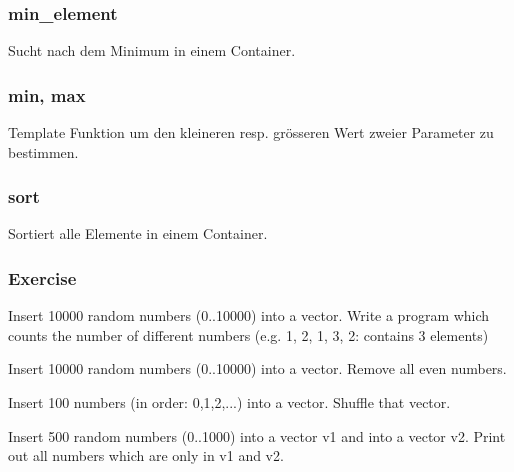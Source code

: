\begin{frame}[fragile]
\frametitle{min\_element}
{\tiny
Sucht nach dem Minimum in einem Container.


}
\end{frame}

\begin{frame}[fragile]
\frametitle{min, max}
{\tiny
Template Funktion um den kleineren resp. grösseren Wert zweier Parameter
zu bestimmen.


}
\end{frame}

\begin{frame}[fragile]
\frametitle{sort}
{\tiny
Sortiert alle Elemente in einem Container.


}
\end{frame}

\begin{frame}[fragile]
\frametitle{Exercise}
{\tiny
\begin{exercise}
Insert 10000 random numbers (0..10000) into a vector. Write a program which counts
the number of different numbers (e.g. 1, 2, 1, 3, 2: contains 3 elements)
\end{exercise}
\begin{exercise}
Insert 10000 random numbers (0..10000) into a vector. Remove all even numbers.
\end{exercise}
\begin{exercise}
Insert 100 numbers (in order: 0,1,2,...) into a vector. Shuffle that vector.
\end{exercise}
\begin{exercise}
Insert 500 random numbers (0..1000) into a vector v1 and into a vector v2. Print
out all numbers which are only in v1 and v2.
\end{exercise}
}
\end{frame}
